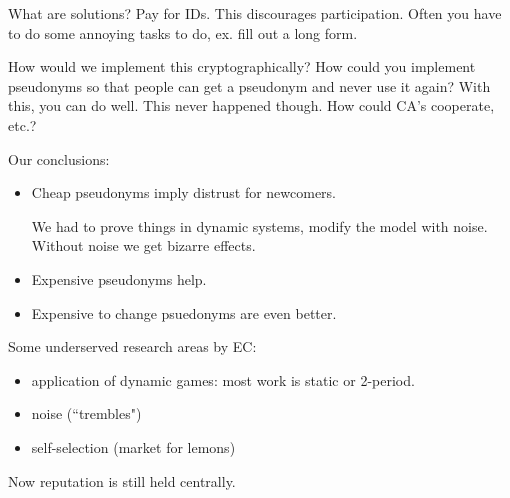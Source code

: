 What are solutions? Pay for IDs. This discourages participation. Often you have to do some annoying tasks to do, ex. fill out a long form.

How would we implement this cryptographically? How could you implement pseudonyms so that people can get a pseudonym and never use it again? With this, you can do well. This never happened though. How could CA's cooperate, etc.?

Our conclusions:
\begin{itemize}
\item
Cheap pseudonyms imply distrust for newcomers.

We had to prove things in dynamic systems, modify the model with noise.
Without noise we get bizarre effects.
\item
Expensive pseudonyms help.
\item
Expensive to change psuedonyms are even better.
\end{itemize}

Some underserved research areas by EC:
\begin{itemize}
\item
application of dynamic games: most work is static or 2-period.
\item
noise (``trembles")
\item
self-selection (market for lemons)
\end{itemize}

Now reputation is still held centrally. %

